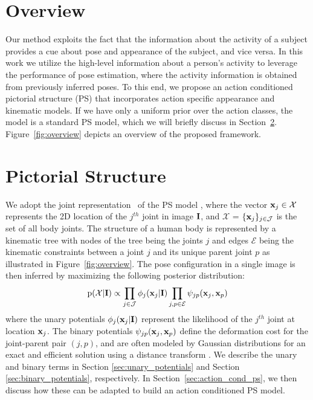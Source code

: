 \documentclass[a4paper, 10pt, conference]{ieeeconf}      \usepackage{FG2017}
\begin{document}
\section{Overview}\label{sec:overview}

Our method exploits the fact that the information about the activity of a subject provides a cue about pose and appearance of the subject, and vice versa. 
In this work we utilize the high-level information about a person's activity to leverage the performance of pose estimation, where the activity information is obtained from previously inferred poses. To this end, we propose an action conditioned pictorial structure (PS) that incorporates action specific appearance and kinematic models. If we have only a uniform prior over the action classes, the model is a standard PS model, which we will briefly discuss in Section~\ref{sec:PS_model}. Figure~\ref{fig:overview} depicts an overview of the proposed framework.    

\section{Pictorial Structure}\label{sec:PS_model}

We adopt the joint representation~\cite{dantone_tpami2014} of the PS model \cite{Felzenszwalb_ijcv2005}, where the vector $\bold{x}_j \in \mathcal{X}$ represents the 2D location of the $j^{th}$ joint in image $\bold{I}$, and $\mathcal{X}$ = $\{\bold{x}_j\}_{j \in \mathcal{J}}$ is the set of all body joints. The structure of a human body is represented by a kinematic tree with nodes of the tree being the joints ${j}$ and edges $\mathcal{E}$ being the kinematic constraints between a joint $j$ and its unique parent joint $p$ as illustrated in Figure~\ref{fig:overview}. The pose configuration in a single image is then inferred by maximizing the following posterior distribution:
\begin{equation}
\label{eqt:ps}
\mathrm{p}(\mathcal{X}|\bold{I}) \propto \prod_{j \in \mathcal{J}} \phi_j(\bold{x}_j|\bold{I})  \prod_{j,p \in \mathcal{E}} \psi_{jp}(\bold{x}_j, \bold{x}_p)  
\end{equation}
where the unary potentials $\phi_j(\bold{x}_j|\bold{I})$ represent the likelihood of the $j^{th}$ joint at location $\bold{x}_j$. The binary potentials $\psi_{jp}(\bold{x}_j, \bold{x}_p)$ define the deformation cost for the joint-parent pair $(j, p)$, and are often modeled by Gaussian distributions for an exact and efficient solution using a distance transform \cite{Felzenszwalb_ijcv2005}. 
We describe the unary and binary terms in Section \ref{sec:unary_potentials} and Section \ref{sec:binary_potentials}, respectively. In Section~\ref{sec:action_cond_ps}, we then discuss how these can be adapted to build an action conditioned PS model.
\end{document}
